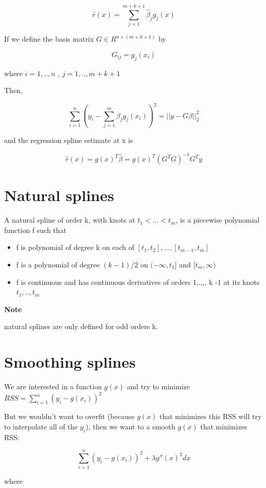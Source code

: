 \documentclass[
]{book}
\providecommand{\tightlist}{%
  \setlength{\itemsep}{0pt}\setlength{\parskip}{0pt}}
\begin{document}
\[
\hat{r}(x) = \sum_{j=1}^{m+k+1} \hat{\beta}_j g_j (x)
\]

If we define the basis matrix \(G \in R^{n \times (m+k+1)}\) by

\[
G_{ij} = g_j(x_i) 
\]

where \(i = 1,..,n\) , \(j = 1,..,m+k+1\)

Then,

\[
\sum_{i=1}^{n} (y_i - \sum_{j=1}^{m} \beta_j g_j (x_i))^2 = ||y - G \beta||_2^2
\]

and the regression spline estimate at x is

\[
\hat{r} (x) = g(x)^T \hat{\beta}= g(x)^T(G^TG)^{-1}G^Ty
\]

\hypertarget{natural-splines}{%
\section{Natural splines}\label{natural-splines}}

A natural spline of order k, with knots at \(t_1 <...< t_m\), is a piecewise polynomial function f such that

\begin{itemize}
\tightlist
\item
  f is polynomial of degree k on each of \([t_1,t_2],...,[t_{m-1},t_m]\)
\item
  f is a polynomial of degree \((k-1)/2\) on \((-\infty,t_1]\) and \([t_m,\infty)\)
\item
  f is continuous and has continuous derivatives of orders 1,.,,, k -1 at its knots \(t_1,..,t_m\)
\end{itemize}

\textbf{Note}

natural splines are only defined for odd orders k.

\hypertarget{smoothing-splines}{%
\section{Smoothing splines}\label{smoothing-splines}}

We are interested in a function \(g(x)\) and try to minimize \(RSS = \sum_{i=1}^n (y_i -g(x_i))^2\)

But we wouldn't want to overfit (because \(g(x)\) that minimizes this RSS will try to interpolate all of the \(y_i\)), then we want to a smooth \(g(x)\) that minimizes RSS:

\[
\sum_{i=1}^n (y_i - g(x_i))^2 + \lambda g''(x)^2 dx
\]

where
\end{document}
